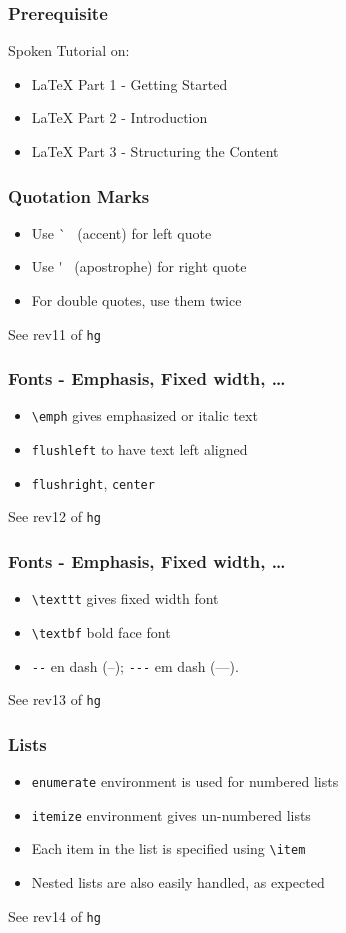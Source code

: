 \documentclass[14pt,compress]{beamer}
\newcommand{\typ}[1]{\lstinline{#1}}
\begin{document}
\begin{frame}
  \frametitle{Prerequisite}
  Spoken Tutorial on:
  \begin{itemize}
  \item {\LaTeX} Part 1 - Getting Started
  \item {\LaTeX} Part 2 - Introduction
  \item {\LaTeX} Part 3 - Structuring the Content
  \end{itemize}
\end{frame}

\begin{frame}[fragile]
  \frametitle{Quotation Marks}
  \begin{itemize}
  \item Use \`~ (accent) for left quote
  \item Use \'~ (apostrophe) for right quote
  \item For double quotes, use them twice
  \end{itemize}
  \tiny See rev11 of \typ{hg}
\end{frame}

\begin{frame}[fragile]
  \frametitle{Fonts - Emphasis, Fixed width, \ldots}
  \begin{itemize}
  \item \lstinline{\emph} gives emphasized or italic text
  \item \typ{flushleft} to have text left aligned
  \item \typ{flushright}, \typ{center}
  \end{itemize}
  \tiny See rev12 of \typ{hg}
\end{frame}

\begin{frame}[fragile]
  \frametitle{Fonts - Emphasis, Fixed width, \ldots}
  \begin{itemize}
  \item \lstinline{\texttt} gives fixed width font
  \item \lstinline{\textbf} bold face font
  \item \lstinline{--} en dash (--); \lstinline{---} em dash (---). 
  \end{itemize}
  \tiny See rev13 of \typ{hg}
\end{frame}

\begin{frame}[fragile]
  \frametitle{Lists}
  \begin{itemize}
  \item \lstinline{enumerate} environment is used for numbered lists
  \item \lstinline{itemize} environment gives un-numbered lists
  \item Each item in the list is specified using \lstinline{\item}
  \item Nested lists are also easily handled, as expected
  \end{itemize}
  \tiny See rev14 of \typ{hg}
\end{frame}
\end{document}
